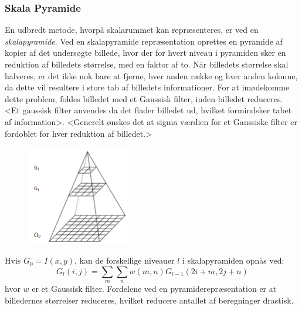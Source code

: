 \subsubsection*{Skala Pyramide}
En udbredt metode, hvorpå skalarummet kan repræsenteres, er ved en \textit{skalapyramide}. Ved en skalapyramide repræsentation oprettes en pyramide af kopier af det undersøgte billede, hvor der for hvert niveau i pyramiden sker en reduktion af billedets størrelse, med en faktor af to. 
Når billedets størrelse skal halveres, er det ikke nok bare at fjerne, hver anden række og hver anden kolonne, da dette vil resultere i store tab af billedets informationer. For at imødekomme dette problem, foldes billedet med et Gaussisk filter, inden billedet reduceres. <Et gaussisk filter anvendes da det flader billedet ud, hvilket formindsker tabet af information>. <Generelt ønskes det at sigma værdien for et Gaussiske filter er fordoblet for hver reduktion af billedet.>
 \begin{figure}[H]
    \centering
    \includegraphics[width=0.40\textwidth]{fig/40.png}
     \vspace{-1em}
    \begin{center}    
       \caption{\textcolor{gray}{\footnotesize \textit{ }}}
    \label{fig:scalerepdiff}
     \end{center}
     \vspace{-2.5em}
  \end{figure} \noindent
Hvis $G_0=I(x,y)$, kan de forskellige niveauer $l$ i skalapyramiden opnås ved:
\begin{equation}
G_l(i,j)=\sum\limits_{m}\sum\limits_{n}w(m,n)G_{l-1}(2i+m,2j+n)
\end{equation}
hvor $w$ er et Gaussisk filter. Fordelene ved en pyramiderepræsentation er at billedernes størrelser reduceres, hvilket reducere antallet af beregninger drastisk.